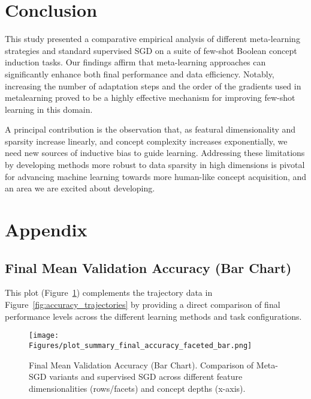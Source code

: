 \documentclass{article}
\begin{document}
\section{Conclusion}
This study presented a comparative empirical analysis of different meta-learning strategies and standard supervised SGD on a suite of few-shot Boolean concept induction tasks. Our findings affirm that meta-learning approaches can significantly enhance both final performance and data efficiency. Notably, increasing the number of adaptation steps and the order of the gradients used in metalearning proved to be a highly effective mechanism for improving few-shot learning in this domain. 

A principal contribution is the observation that, as featural dimensionality and sparsity increase linearly, and concept complexity increases exponentially, we need new sources of inductive bias to guide learning. Addressing these limitations by developing methods more robust to data sparsity in high dimensions is pivotal for advancing machine learning towards more human-like concept acquisition, and an area we are excited about developing. 

\newpage %
{\small


}

\newpage
\appendix
\section{Appendix}

\subsection{Final Mean Validation Accuracy (Bar Chart)}\label{app:final_acc_bar}
This plot (Figure~\ref{fig:final_accuracy_bar_appendix}) complements the trajectory data in Figure~\ref{fig:accuracy_trajectories} by providing a direct comparison of final performance levels across the different learning methods and task configurations.
\begin{figure}[H]
    \centering
    \texttt{[image: Figures/plot\_summary\_final\_accuracy\_faceted\_bar.png]} %
    \caption{Final Mean Validation Accuracy (Bar Chart). Comparison of Meta-SGD variants and supervised SGD across different feature dimensionalities (rows/facets) and concept depths (x-axis). }
    \label{fig:final_accuracy_bar_appendix}
\end{figure}
\end{document}
